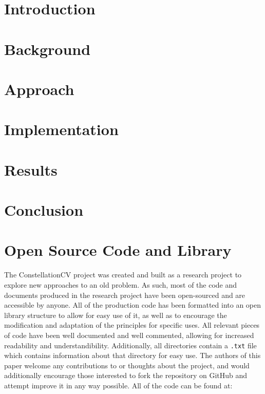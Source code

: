 \documentclass[preprint,12pt]{elsarticle}
\begin{document}
\section{Introduction}
\label{S:1}


\section{Background}
\label{S:2}




\section{Approach}
\label{S:3}


\section{Implementation}
\label{S:4}


\section{Results}
\label{S:5}


\section{Conclusion}
\label{S:6}



\appendix

\nocite{*}

\newcommand{\nocontentsline}[3]{}
\newcommand{\tocless}[2]{\bgroup\let\addcontentsline=\nocontentsline#1{#2}\egroup}

\pagebreak

\tocless\section{Open Source Code and Library}
\label{A:1}
The ConstellationCV project was created and built as a research project to explore new approaches to an old problem. As such, most of the code
and documents produced in the research project have been open-sourced and are accessible by anyone. All of the production code has been formatted into an open library structure to allow for easy use of it, as well as to encourage the modification and adaptation of the principles for specific uses. All relevant pieces of code have been well documented and well commented, allowing for increased readability and understandibility. Additionally, all directories contain a \texttt{.txt} file which contains information about that directory for easy use. The authors of this paper welcome any contributions to or thoughts about the project, and would additionally encourage those interested to fork the repository on GitHub and attempt improve it in any way possible. All of the code can be found at:\\
\end{document}
